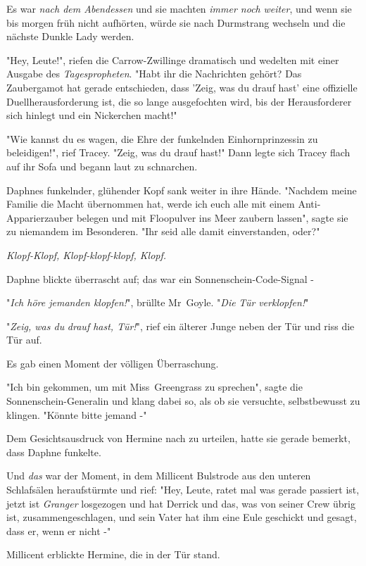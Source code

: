 {Es war \emph{nach dem Abendessen} und sie machten \emph{immer noch} \emph{weiter}, und wenn sie bis morgen früh nicht aufhörten, würde sie nach Durmstrang wechseln und die nächste Dunkle Lady werden.

"Hey, Leute!", riefen die Carrow-Zwillinge dramatisch und wedelten mit einer Ausgabe des \emph{Tagespropheten}. "Habt ihr die Nachrichten gehört? Das Zaubergamot hat gerade entschieden, dass 'Zeig, was du drauf hast' eine offizielle Duellherausforderung ist, die so lange ausgefochten wird, bis der Herausforderer sich hinlegt und ein Nickerchen macht!"

"Wie kannst du es wagen, die Ehre der funkelnden Einhornprinzessin zu beleidigen!", rief Tracey. "Zeig, was du drauf hast!" Dann legte sich Tracey flach auf ihr Sofa und begann laut zu schnarchen.

Daphnes funkelnder, glühender Kopf sank weiter in ihre Hände. "Nachdem meine Familie die Macht übernommen hat, werde ich euch alle mit einem Anti-Apparierzauber belegen und mit Floopulver ins Meer zaubern lassen", sagte sie zu niemandem im Besonderen. "Ihr seid alle damit einverstanden, oder?"

\emph{\emph{Klopf-Klopf, Klopf-klopf-klopf, Klopf.}}

Daphne blickte überrascht auf; das war ein Sonnenschein-Code-Signal -

"\emph{Ich höre jemanden klopfen!}", brüllte Mr~Goyle. "\emph{Die} \emph{Tür} \emph{verklopfen!}"

"\emph{Zeig, was du} \emph{drauf hast, Tür!}", rief ein älterer Junge neben der Tür und riss die Tür auf.

Es gab einen Moment der völligen Überraschung.

"Ich bin gekommen, um mit Miss~Greengrass zu sprechen", sagte die Sonnenschein-Generalin und klang dabei so, als ob sie versuchte, selbstbewusst zu klingen. "Könnte bitte jemand -"

Dem Gesichtsausdruck von Hermine nach zu urteilen, hatte sie gerade bemerkt, dass Daphne funkelte.

Und \emph{das} war der Moment, in dem Millicent Bulstrode aus den unteren Schlafsälen heraufstürmte und rief: "Hey, Leute, ratet mal was gerade passiert ist, jetzt ist \emph{Granger} losgezogen und hat Derrick und das, was von seiner Crew übrig ist, zusammengeschlagen, und sein Vater hat ihm eine Eule geschickt und gesagt, dass er, wenn er nicht -"

Millicent erblickte Hermine, die in der Tür stand.

}
